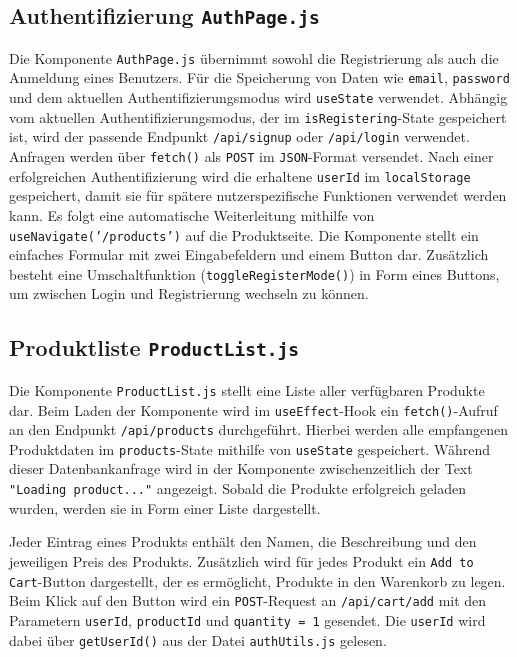 \documentclass[oneside]{ausarbeitung}
\begin{document}
\subsection{Authentifizierung \texttt{AuthPage.js}} 

Die Komponente \texttt{AuthPage.js} übernimmt sowohl die Registrierung als auch die Anmeldung eines Benutzers.
Für die Speicherung von Daten wie \texttt{email}, \texttt{password} und dem aktuellen Authentifizierungsmodus wird \texttt{useState} verwendet. Abhängig vom aktuellen Authentifizierungsmodus, der im \texttt{isRegistering}-State gespeichert ist, wird der passende Endpunkt \texttt{/api/signup} oder \texttt{/api/login} verwendet.
Anfragen werden über \texttt{fetch()} als \texttt{POST} im \texttt{JSON}-Format versendet.
Nach einer erfolgreichen Authentifizierung wird die erhaltene \texttt{userId} im \texttt{localStorage} gespeichert, damit sie für spätere nutzerspezifische Funktionen verwendet werden kann. Es folgt eine automatische Weiterleitung mithilfe von \texttt{useNavigate('/products')} auf die Produktseite.
Die Komponente stellt ein einfaches Formular mit zwei Eingabefeldern und einem Button dar. Zusätzlich besteht eine Umschaltfunktion (\texttt{toggleRegisterMode()}) in Form eines Buttons, um zwischen Login und Registrierung wechseln zu können.

\subsection{Produktliste \texttt{ProductList.js}} 

Die Komponente \texttt{ProductList.js} stellt eine Liste aller verfügbaren Produkte dar. Beim Laden der Komponente wird im \texttt{useEffect}-Hook ein \texttt{fetch()}-Aufruf an den Endpunkt \texttt{/api/products} durchgeführt. Hierbei werden alle empfangenen Produktdaten im \texttt{products}-State mithilfe von \texttt{useState} gespeichert. Während dieser Datenbankanfrage wird in der Komponente zwischenzeitlich der Text \texttt{"Loading product..."} angezeigt. Sobald die Produkte erfolgreich geladen wurden, werden sie in Form einer Liste dargestellt.

Jeder Eintrag eines Produkts enthält den Namen, die Beschreibung und den jeweiligen Preis des Produkts. Zusätzlich wird für jedes Produkt ein \texttt{Add to Cart}-Button dargestellt, der es ermöglicht, Produkte in den Warenkorb zu legen. Beim Klick auf den Button wird ein \texttt{POST}-Request an \texttt{/api/cart/add} mit den Parametern \texttt{userId}, \texttt{productId} und \texttt{quantity = 1} gesendet. Die \texttt{userId} wird dabei über \texttt{getUserId()} aus der Datei \texttt{authUtils.js} gelesen.
\end{document}
